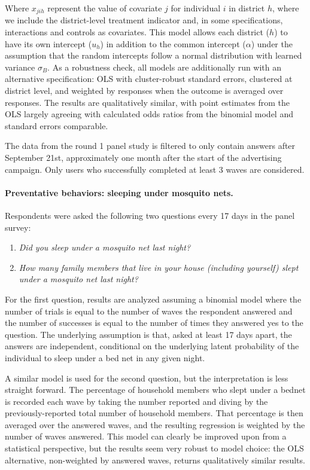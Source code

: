 \documentclass[a4paper,12pt]{article}
\begin{document}
Where $x_{jih}$ represent the value of covariate $j$ for individual $i$ in district $h$, where we include the district-level treatment indicator and, in some specifications, interactions and controls as covariates. This model allows each district ($h$) to have its own intercept ($u_h$) in addition to the common intercept ($\alpha$) under the assumption that the random intercepts follow a normal distribution with learned variance $\sigma_B$. As a robustness check, all models are additionally run with an alternative specification: OLS with cluster-robust standard errors, clustered at district level, and weighted by responses when the outcome is averaged over responses. The results are qualitatively similar, with point estimates from the OLS largely agreeing with calculated odds ratios from the binomial model and standard errors comparable.


The data from the round 1 panel study is filtered to only contain answers after September 21st, approximately one month after the start of the advertising campaign. Only users who successfully completed at least 3 waves are considered.


\paragraph{Preventative behaviors: sleeping under mosquito nets.} Respondents were asked the following two questions every 17 days in the panel survey:

\begin{enumerate}
\item \textit{Did you sleep under a mosquito net last night?}
\item \textit{How many family members that live in your house (including yourself) slept under a mosquito net last night?}
\end{enumerate}

For the first question, results are analyzed assuming a binomial model where the number of trials is equal to the number of waves the respondent answered and the number of successes is equal to the number of times they answered yes to the question. The underlying assumption is that, asked at least 17 days apart, the answers are independent, conditional on the underlying latent probability of the individual to sleep under a bed net in any given night.

A similar model is used for the second question, but the interpretation is less straight forward. The percentage of household members who slept under a bednet is recorded each wave by taking the number reported and diving by the previously-reported total number of household members. That percentage is then averaged over the answered waves, and the resulting regression is weighted by the number of waves answered. This model can clearly be improved upon from a statistical perspective, but the results seem very robust to model choice: the OLS alternative, non-weighted by answered waves, returns qualitatively similar results.
\end{document}
